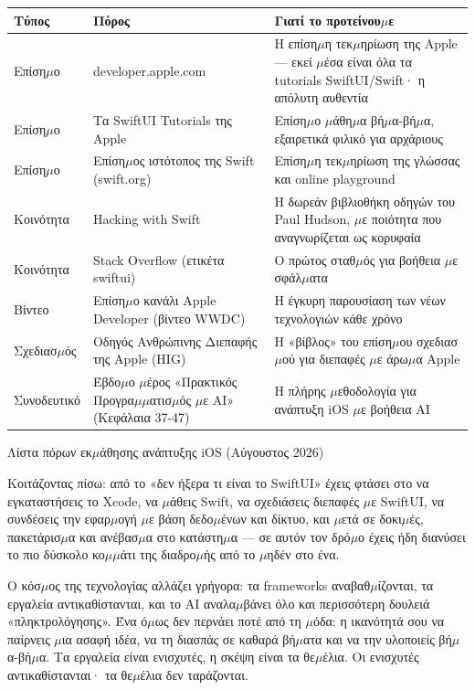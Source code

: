 \begin{center}
\begin{tabularx}{\linewidth}{|X|X|X|}
\hline
\textbf{Τύπος} & \textbf{Πόρος} & \textbf{Γιατί το προτείνου$\mu$ε} \tabularnewline
\hline
Επίση$\mu$ο & developer.apple.com & Η επίση$\mu$η τεκ$\mu$ηρίωση της Apple — εκεί $\mu$έσα είναι όλα τα tutorials SwiftUI/Swift· η απόλυτη αυθεντία \tabularnewline
Επίση$\mu$ο & Τα SwiftUI Tutorials της Apple & Επίση$\mu$ο $\mu$άθη$\mu$α βή$\mu$α-βή$\mu$α, εξαιρετικά φιλικό για αρχάριους \tabularnewline
Επίση$\mu$ο & Επίση$\mu$ος ιστότοπος της Swift (swift.org) & Επίση$\mu$η τεκ$\mu$ηρίωση της γλώσσας και online playground \tabularnewline
Κοινότητα & Hacking with Swift & Η δωρεάν βιβλιοθήκη οδηγών του Paul Hudson, $\mu$ε ποιότητα που αναγνωρίζεται ως κορυφαία \tabularnewline
Κοινότητα & Stack Overflow (ετικέτα swiftui) & Ο πρώτος σταθ$\mu$ός για βοήθεια $\mu$ε σφάλ$\mu$ατα \tabularnewline
Βίντεο & Επίση$\mu$ο κανάλι Apple Developer (βίντεο WWDC) & Η έγκυρη παρουσίαση των νέων τεχνολογιών κάθε χρόνο \tabularnewline
Σχεδιασ$\mu$ός & Οδηγός Ανθρώπινης Διεπαφής της Apple (HIG) & Η «βίβλος» του επίση$\mu$ου σχεδιασ$\mu$ού για διεπαφές $\mu$ε άρω$\mu$α Apple \tabularnewline
Συνοδευτικό & Έβδο$\mu$ο $\mu$έρος «Πρακτικός Προγρα$\mu$$\mu$ατισ$\mu$ός $\mu$ε AI» (Κεφάλαια 37-47) & Η πλήρης $\mu$εθοδολογία για ανάπτυξη iOS $\mu$ε βοήθεια AI \tabularnewline
\hline
\end{tabularx}
\end{center}

\begin{center}\small\color{gray}Λίστα πόρων εκ$\mu$άθησης ανάπτυξης iOS (Αύγουστος 2026)\end{center}


Κοιτάζοντας πίσω: από το «δεν ήξερα τι είναι το SwiftUI» έχεις φτάσει στο να εγκαταστήσεις το Xcode, να $\mu$άθεις Swift, να σχεδιάσεις διεπαφές $\mu$ε SwiftUI, να συνδέσεις την εφαρ$\mu$ογή $\mu$ε βάση δεδο$\mu$ένων και δίκτυο, και $\mu$ετά σε δοκι$\mu$ές, πακετάρισ$\mu$α και ανέβασ$\mu$α στο κατάστη$\mu$α — σε αυτόν τον δρό$\mu$ο έχεις ήδη διανύσει το πιο δύσκολο κο$\mu$$\mu$άτι της διαδρο$\mu$ής από το $\mu$ηδέν στο ένα.

Ο κόσ$\mu$ος της τεχνολογίας αλλάζει γρήγορα: τα frameworks αναβαθ$\mu$ίζονται, τα εργαλεία αντικαθίστανται, και το AI αναλα$\mu$βάνει όλο και περισσότερη δουλειά «πληκτρολόγησης». Ένα ό$\mu$ως δεν περνάει ποτέ από τη $\mu$όδα: η ικανότητά σου να παίρνεις $\mu$ια ασαφή ιδέα, να τη διασπάς σε καθαρά βή$\mu$ατα και να την υλοποιείς βή$\mu$α-βή$\mu$α. Τα εργαλεία είναι ενισχυτές, η σκέψη είναι τα θε$\mu$έλια. Οι ενισχυτές αντικαθίστανται· τα θε$\mu$έλια δεν ταράζονται.

